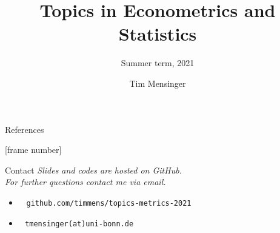 \documentclass[serif, mathsansserif, aspectratio=169]{beamer}   %
\title{Topics in Econometrics and Statistics}
\subtitle{Summer term, 2021}
\author{Tim Mensinger}
\institute{University of Bonn}
\date{}
\begin{document}
\begin{frame}
    \maketitle
\end{frame}

\begin{frame}
    \tableofcontents[hideallsubsections]
\end{frame}








\begin{frame}{References}
    \nocite{*}
    \printbibliography
\end{frame}

[frame number]{}  %
\begin{frame}{Contact}
    \vspace{-1.5cm}
    \emph{
    Slides and codes are hosted on GitHub.\\
    For further questions contact me via email.
    }
    \vspace{1cm}
    \begin{itemize}
        \item[] \large {} \,\,\, \texttt{github.com/timmens/topics-metrics-2021}
        \item[] \large {} \,\, \texttt{tmensinger(at)uni-bonn.de}
    \end{itemize}
\end{frame}
\end{document}
